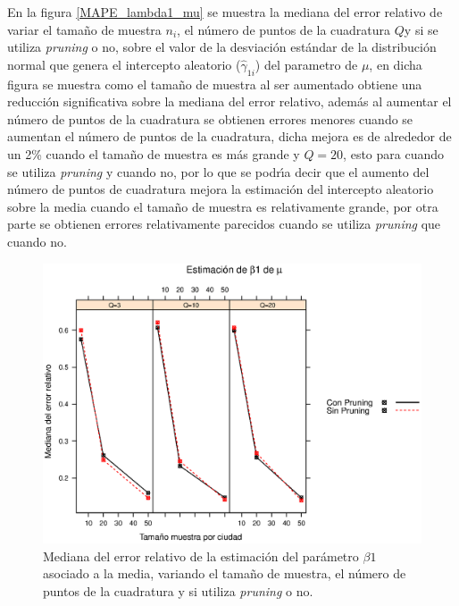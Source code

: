 En la figura \ref{MAPE_lambda1_mu} se muestra la mediana del error relativo de variar el tama\~{n}o de muestra $n_i$, el n\'{u}mero de puntos de la cuadratura $Q$y si se utiliza \textit{pruning} o no, sobre el valor de la desviaci\'{o}n est\'{a}ndar de la distribuci\'{o}n normal que genera el intercepto aleatorio ($\hat{\gamma}_{1i}$) del parametro de $\mu$, en dicha figura se muestra como el tama\~{n}o de muestra al ser aumentado obtiene una reducci\'{o}n significativa sobre la mediana del error relativo, adem\'{a}s al aumentar el n\'{u}mero de puntos de la cuadratura se obtienen errores menores cuando se aumentan el n\'{u}mero de puntos de la cuadratura, dicha mejora es de alrededor de un 2\% cuando el tama\~{n}o de muestra es m\'{a}s grande y $Q=20$, esto para cuando se utiliza \textit{pruning} y cuando no, por lo que se podr\'{\i}a decir que el aumento del n\'{u}mero de puntos de cuadratura mejora la estimaci\'{o}n del intercepto aleatorio sobre la media cuando el tama\~{n}o de muestra es relativamente grande, por otra parte se obtienen errores relativamente parecidos cuando se utiliza \textit{pruning} que cuando no.\\


\begin{figure}
	\begin{center}
		\includegraphics[scale=0.6]{MAPE_beta1_mu.eps}	
		\caption{Mediana del error relativo de la estimaci\'{o}n del par\'{a}metro $\beta1$ asociado a la media, variando el tama\~{n}o de muestra, el n\'{u}mero de puntos de la cuadratura y si utiliza \textit{pruning} o no.}
		\label{MAPE_beta1_mu}
	\end{center}
\end{figure}

